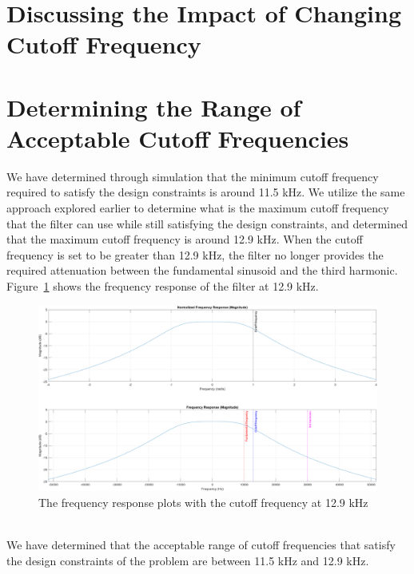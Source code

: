 \documentclass[12pt]{article}
\begin{document}
\section*{Discussing the Impact of Changing Cutoff Frequency}

\section*{Determining the Range of Acceptable Cutoff Frequencies}
We have determined through simulation that the minimum cutoff frequency required to satisfy the design constraints is around 11.5 kHz. We utilize the same approach explored earlier to determine what is the maximum cutoff frequency that the filter can use while still satisfying the design constraints, and determined that the maximum cutoff frequency is around 12.9 kHz. When the cutoff frequency is set to be greater than 12.9 kHz, the filter no longer provides the required attenuation between the fundamental sinusoid and the third harmonic. Figure~\ref{fig:max_freq_response} shows the frequency response of the filter at 12.9 kHz.
\begin{figure}[h!]
    \includegraphics[width=\textwidth]{max_frequency_response.png}
    \caption{\label{fig:max_freq_response} The frequency response plots with the cutoff frequency at 12.9 kHz}
\end{figure} \\

We have determined that the acceptable range of cutoff frequencies that satisfy the design constraints of the problem are between 11.5 kHz and 12.9 kHz.
\end{document}
